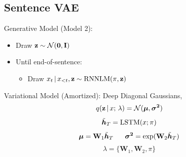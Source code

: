 
\subsection{Sentence VAE}
\begin{frame}
Generative Model (Model 2):
\begin{itemize}
    \item Draw $\mathbf{z} \sim \mathcal{N}(\mathbf{0}, \mathbf{I})$
    \item Until end-of-sentence:
    \begin{itemize}
    \item Draw $x_{t} \,|\, x_{<t}, \mathbf{z} \sim \operatorname*{RNNLM}( \pi, \mathbf{z})$
    \end{itemize}
\end{itemize}

Variational Model (Amortized): Deep Diagonal Gaussians, 
\[ q(\mathbf{z} \,|\, x ; \, \lambda ) = \mathcal{N}(\boldsymbol{\mu}, \boldsymbol{\sigma^2}) \]
\[ \tilde{\boldsymbol{h}}_T = \operatorname*{LSTM}(x; \pi) \]
\[ \boldsymbol{\mu} = \mathbf{W}_1\tilde{\boldsymbol{h}}_T \,\,\,\,\,\,\,\,\,\, \boldsymbol{\sigma^2} = \exp(\mathbf{W}_2 \tilde{\boldsymbol{h}}_T)\]
\[ \lambda = \{\mathbf{W}_1, \mathbf{W}_2, \pi\}\]
\end{frame}


